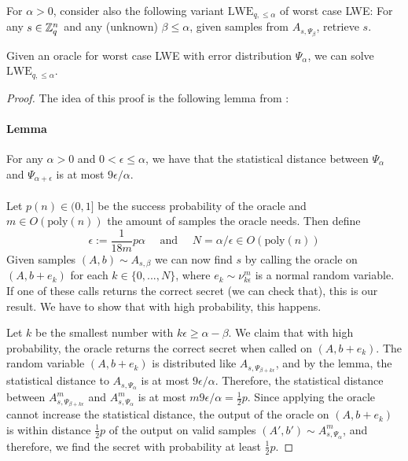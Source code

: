 For $\alpha > 0$, consider also the following variant $\mathrm{LWE}_{q, \leq \alpha}$ of worst case LWE: For any $s \in \mathbb{Z}_q^n$ and any (unknown) $\beta \leq \alpha$, given samples from $A_{s, \Psi_\beta}$, retrieve $s$.

\label{lwe_leq_alpha_lwe_alpha}
Given an oracle for worst case LWE with error distribution $\Psi_\alpha$, we can solve $\mathrm{LWE}_{q, \leq \alpha}$.

\begin{proof}
The idea of this proof is the following lemma from \cite[2.2]{Reg}:
\paragraph{Lemma} For any $\alpha > 0$ and $0 < \epsilon \leq \alpha$, we have that the statistical distance between $\Psi_\alpha$ and $\Psi_{\alpha + \epsilon}$ is at most $9\epsilon / \alpha$.
\\\\
Let $p(n) \in (0, 1]$ be the success probability of the oracle and $m \in O(\mathrm{poly}(n))$ the amount of samples the oracle needs. Then define 
\begin{equation}
\epsilon := \frac 1 {18m} p \alpha \quad \text{ and } \quad N = \alpha/\epsilon \in O(\mathrm{poly}(n)) \nonumber
\end{equation}
Given samples $(A, b) \sim A_{s, \beta}$ we can now find $s$ by calling the oracle on $(A, b + e_k)$ for each $k \in \{ 0, ..., N \}$, where $e_k \sim \nu_{k\epsilon}^m$ is a normal random variable. If one of these calls returns the correct secret (we can check that), this is our result. We have to show that with high probability, this happens. 

Let $k$ be the smallest number with $k\epsilon \geq \alpha - \beta$. We claim that with high probability, the oracle returns the correct secret when called on $(A, b + e_k)$. The random variable $(A, b + e_k)$ is distributed like $A_{s, \Psi_{\beta + k\epsilon}}$, and by the lemma, the statistical distance to $A_{s, \Psi_\alpha}$ is at most $9\epsilon / \alpha$. Therefore, the statistical distance between $A_{s, \Psi_{\beta + k\epsilon}}^m$ and $A_{s, \Psi_\alpha}^m$ is at most $m 9\epsilon / \alpha = \frac 1 2 p$. Since applying the oracle cannot increase the statistical distance, the output of the oracle on $(A, b + e_k)$ is within distance $\frac 1 2 p$ of the output on valid samples $(A', b') \sim A_{s, \Psi_\alpha}^m$, and therefore, we find the secret with probability at least $\frac 1 2 p$. \qedhere
\end{proof}

